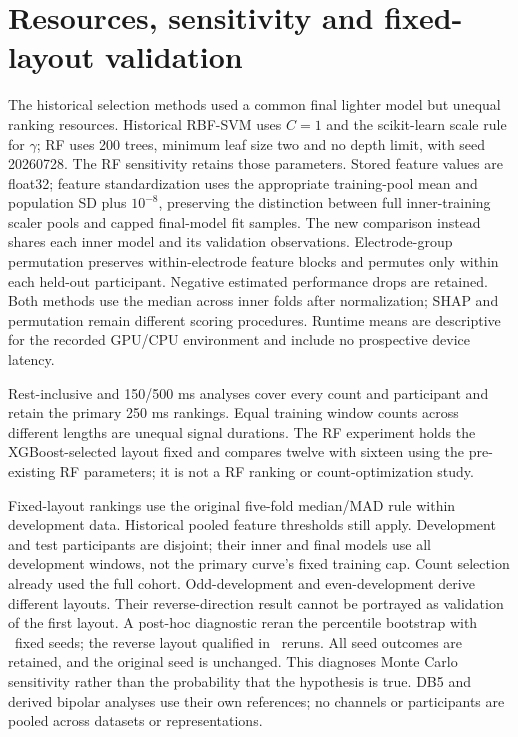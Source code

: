 \documentclass{iopjournal}
\begin{document}
\section{Resources, sensitivity and fixed-layout validation}
The historical selection methods used a common final lighter model but unequal ranking resources. Historical RBF-SVM uses $C=1$ and the scikit-learn scale rule for $\gamma$; RF uses 200 trees, minimum leaf size two and no depth limit, with seed 20260728. The RF sensitivity retains those parameters. Stored feature values are float32; feature standardization uses the appropriate training-pool mean and population SD plus $10^{-8}$, preserving the distinction between full inner-training scaler pools and capped final-model fit samples. The new comparison instead shares each inner model and its validation observations. Electrode-group permutation preserves within-electrode feature blocks and permutes only within each held-out participant. Negative estimated performance drops are retained. Both methods use the median across inner folds after normalization; SHAP and permutation remain different scoring procedures. Runtime means are descriptive for the recorded GPU/CPU environment and include no prospective device latency.

Rest-inclusive and 150/500 ms analyses cover every count and participant and retain the primary 250 ms rankings. Equal training window counts across different lengths are unequal signal durations. The RF experiment holds the XGBoost-selected layout fixed and compares twelve with sixteen using the pre-existing RF parameters; it is not a RF ranking or count-optimization study.

Fixed-layout rankings use the original five-fold median/MAD rule within development data. Historical pooled feature thresholds still apply. Development and test participants are disjoint; their inner and final models use all development windows, not the primary curve's fixed training cap. Count selection already used the full cohort. Odd-development and even-development derive different layouts. Their reverse-direction result cannot be portrayed as validation of the first layout. A post-hoc diagnostic reran the percentile bootstrap with \RevFixedSwapSeedN\ fixed seeds; the reverse layout qualified in \RevFixedSwapSeedHits\ reruns. All seed outcomes are retained, and the original seed is unchanged. This diagnoses Monte Carlo sensitivity rather than the probability that the hypothesis is true. DB5 and derived bipolar analyses use their own references; no channels or participants are pooled across datasets or representations.
\end{document}
